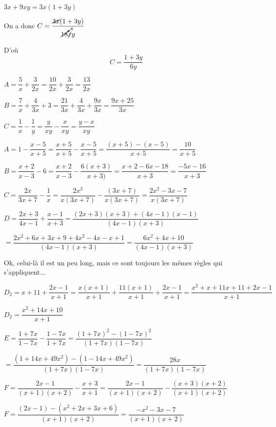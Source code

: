 \documentclass[a4paper,12pt]{scrartcl}
\begin{document}
$3x+9xy = 3x(1+3y)$

On a donc $C = \dfrac{\cancel{3x}(1+3y)}{\cancelto{6}{18}\cancel{x}y}$

D'où $$C = \dfrac{1+3y}{6y}$$


\question{}
$A = \dfrac{5}{x} + \dfrac{3}{2x} = \dfrac{10}{2x} + \dfrac{3}{2x} = \dfrac{13}{2x}$

\question{}
$B = \dfrac{7}{x} + \dfrac{4}{3x} + 3 = \dfrac{21}{3x} + \dfrac{4}{3x} + \dfrac{9x}{3x} = \dfrac{9x + 25}{3x}$

\question{}
$C = \dfrac{1}{x} - \dfrac{1}{y} = \dfrac{y}{xy} - \dfrac{x}{xy} = \dfrac{y-x}{xy}$


\question{}
$A = 1 - \dfrac{x-5}{x+5} = \dfrac{x+5}{x+5} - \dfrac{x-5}{x+5} = \dfrac{(x+5)-(x-5)}{x+5} = \dfrac{10}{x+5}$

\question{}
$B = \dfrac{x+2}{x-3} - 6 = \dfrac{x+2}{x-3} - \dfrac{6(x+3)}{x+3)} = \dfrac{x+2-6x-18}{x+3} = \dfrac{-5x-16}{x+3}$

\question{}
$C = \dfrac{2x}{3x+7} - \dfrac{1}{x} = \dfrac{2x^{2}}{x(3x+7)} - \dfrac{(3x+7)}{x(3x+7)} = \dfrac{2x^{2} - 3x - 7}{x(3x+7)}$

\question{}
$D = \dfrac{2x+3}{4x-1} + \dfrac{x-1}{x+3} = \dfrac{(2x+3)(x+3) + (4x-1)(x-1)}{(4x-1)(x+3)}$ 

$= \dfrac{2x^2 + 6x + 3x + 9 + 4x^2 - 4x - x + 1}{(4x-1)(x+3)} = \dfrac{6x^2 + 4x + 10}{(4x-1)(x+3)}$

Ok, celui-là il est un peu long, mais ce sont toujours les mêmes règles qui s'appliquent...

\question{}
$D_2 = x+11+\dfrac{2x-1}{x+1} = \dfrac{x(x+1)}{x+1} + \dfrac{11(x+1)}{x+1} + \dfrac{2x-1}{x+1} = \dfrac{x^2+x+11x+11+2x-1}{x+1}$

$D_2 = \dfrac{x^2 + 14x + 10}{x+1}$

\question{}
$E = \dfrac{1+7x}{1-7x} - \dfrac{1-7x}{1+7x} = \dfrac{(1+7x)^2 - (1-7x)^2}{(1+7x)(1-7x)}$ 

$= \dfrac{(1+14x+49x^2)-(1-14x+49x^2)}{(1+7x)(1-7x)} = \dfrac{28x}{(1+7x)(1-7x)}$

\question{}
$F = \dfrac{2x-1}{(x+1)(x+2)} - \dfrac{x+3}{x+1} = \dfrac{2x-1}{(x+1)(x+2)} - \dfrac{(x+3)(x+2)}{(x+1)(x+2)}$ 

$F = \dfrac{(2x-1)-(x^2 + 2x + 3x + 6)}{(x+1)(x+2)} = \dfrac{-x^2-3x-7}{(x+1)(x+2)}$

\exo{}
\end{document}
